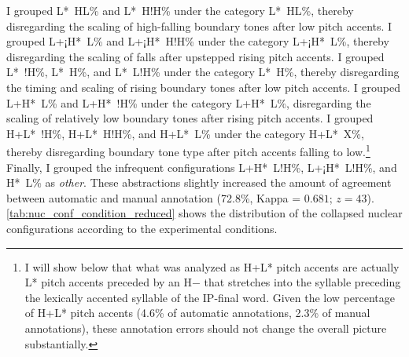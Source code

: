 I grouped L*~HL\% and L*~H!H\% under the category L*~HL\%, thereby disregarding the scaling of high-falling boundary tones after low pitch accents. I grouped L+¡H*~L\% and L+¡H*~H!H\% under the category L+¡H*~L\%, thereby disregarding the scaling of falls after upstepped rising pitch accents. I grouped L*~!H\%, L*~H\%, and L*~L!H\% under the category L*~H\%, thereby disregarding the timing and scaling of rising boundary tones after low pitch accents. I grouped L+H*~L\% and L+H*~!H\% under the category L+H*~L\%, disregarding the scaling of relatively low boundary tones after rising pitch accents. I grouped H+L*~!H\%, H+L*~H!H\%, and H+L*~L\% under the category H+L*~X\%, thereby disregarding boundary tone type after pitch accents falling to low.\footnote{I will show below that what was analyzed as H+L* pitch accents are actually L* pitch accents preceded by an H$-$ that stretches into the syllable preceding the lexically accented syllable of the IP-final word. Given the low percentage of H+L* pitch accents (4.6\% of automatic annotations, 2.3\% of manual annotations), these annotation errors should not change the overall picture substantially.} Finally, I grouped the infrequent configurations L+H*~L!H\%, L+¡H*~L!H\%, and H*~L\% as \textit{other}. These abstractions slightly increased the amount of agreement between automatic and manual annotation (72.8\%, Kappa = $0.681$; $z = 43$). \autoref{tab:nuc_conf_condition_reduced} shows the distribution of the collapsed nuclear configurations according to the experimental conditions.\largerpage

